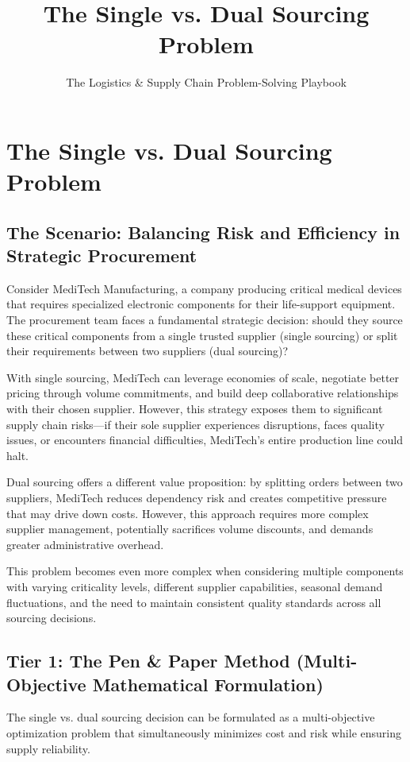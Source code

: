 \documentclass{article}
\title{The Single vs. Dual Sourcing Problem}
\author{The Logistics \& Supply Chain Problem-Solving Playbook}
\date{}
\begin{document}
\maketitle

\section{The Single vs. Dual Sourcing Problem}

\subsection{The Scenario: Balancing Risk and Efficiency in Strategic Procurement}

Consider MediTech Manufacturing, a company producing critical medical devices that requires specialized electronic components for their life-support equipment. The procurement team faces a fundamental strategic decision: should they source these critical components from a single trusted supplier (single sourcing) or split their requirements between two suppliers (dual sourcing)?

With single sourcing, MediTech can leverage economies of scale, negotiate better pricing through volume commitments, and build deep collaborative relationships with their chosen supplier. However, this strategy exposes them to significant supply chain risks---if their sole supplier experiences disruptions, faces quality issues, or encounters financial difficulties, MediTech's entire production line could halt.

Dual sourcing offers a different value proposition: by splitting orders between two suppliers, MediTech reduces dependency risk and creates competitive pressure that may drive down costs. However, this approach requires more complex supplier management, potentially sacrifices volume discounts, and demands greater administrative overhead.

This problem becomes even more complex when considering multiple components with varying criticality levels, different supplier capabilities, seasonal demand fluctuations, and the need to maintain consistent quality standards across all sourcing decisions.

\subsection{Tier 1: The Pen \& Paper Method (Multi-Objective Mathematical Formulation)}

The single vs. dual sourcing decision can be formulated as a multi-objective optimization problem that simultaneously minimizes cost and risk while ensuring supply reliability.
\end{document}
